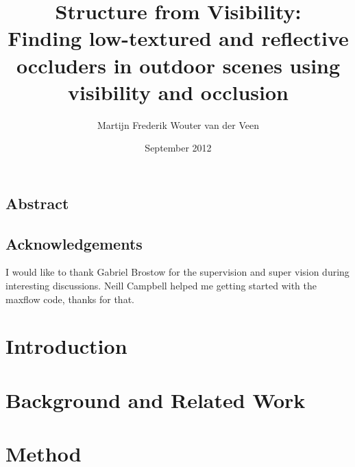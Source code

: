 \documentclass{ucl_thesis}
\title{Structure from Visibility: \\
       Finding low-textured and reflective occluders in outdoor scenes
       using visibility and occlusion}
\author{Martijn Frederik Wouter van der Veen}
\date{September 2012}
\begin{document}

\maketitle
{}
\setcounter{page}{1}
\pagestyle{plain}




\newpage
\section*{Abstract}



\newpage
\section*{Acknowledgements}
I would like to thank Gabriel Brostow for the supervision and super vision during interesting discussions. Neill Campbell helped me getting started with the maxflow code, thanks for that. %


\setcounter{tocdepth}{1}
\tableofcontents
\listoffigures
\listofalgorithms
\newpage

%

\setcounter{page}{1}
\pagestyle{plain}




\chapter{Introduction}
\label{introduction}




\chapter{Background and Related Work}
\label{background}




\chapter{Method} %
\label{method}

\end{document}
